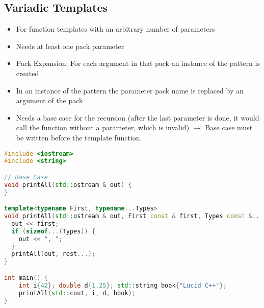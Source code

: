 \subsection{Variadic Templates}
\begin{itemize}
  \itemsep -0.5em 
  \item For function templates with an arbitrary number of parameters
  \item Needs at least one pack parameter
  \item Pack Expansion: For each argument in that pack an instance of the pattern is created
  \item In an instance of the pattern the parameter pack name is replaced by an argument of the pack
  \item Needs a base case for the recursion (after the last parameter is done, it would call the function without a parameter, which is invalid) $\rightarrow$ Base case must be written before the template function.
\end{itemize}
\begin{lstlisting}[language=C++]
#include <iostream>
#include <string>

// Base Case 
void printAll(std::ostream & out) {
}

template<typename First, typename...Types>
void printAll(std::ostream & out, First const & first, Types const &...rest) {
  out << first;
  if (sizeof...(Types)) {
    out << ", ";
  }
  printAll(out, rest...);
}

int main() {
	int i{42}; double d{1.25}; std::string book{"Lucid C++"};
	printAll(std::cout, i, d, book);
}

\end{lstlisting}
